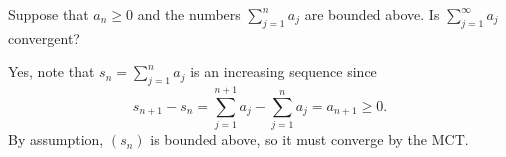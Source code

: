 \documentclass[11pt,dvipsnames]{book}
\numberwithin{equation}{section} %
\numberwithin{figure}{section} %
\numberwithin{table}{section} %
\begin{document}
\begin{exercise}
Suppose that $a_{n}\geq 0$ and the numbers $\sum_{j=1}^{n}a_{j}$ are bounded above.  Is $\sum_{j=1}^{\infty}a_{j}$ convergent?

\begin{solution}
Yes, note that $s_n=\sum_{j=1}^{n}a_{j}$ is an increasing sequence since
\[
s_{n+1}-s_{n}=\sum_{j=1}^{n+1}a_{j}-\sum_{j=1}^{n}a_{j} = a_{n+1}\geq 0.
\]
By assumption, $(s_{n})$ is bounded above, so it must converge by the MCT.
\end{solution}
\end{exercise}

%
%
%
%
\end{document}

